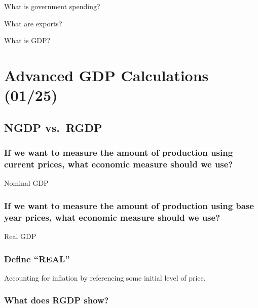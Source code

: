 \documentclass[
  letterpaper,
  DIV=11,
  numbers=noendperiod]{scrartcl}
\begin{document}
What is government spending?

What are exports?

What is GDP?

\newpage{}

\hypertarget{advanced-gdp-calculations-0125}{%
\section{Advanced GDP Calculations
(01/25)}\label{advanced-gdp-calculations-0125}}

\hypertarget{ngdp-vs.-rgdp}{%
\subsection{NGDP vs.~RGDP}\label{ngdp-vs.-rgdp}}

\hypertarget{if-we-want-to-measure-the-amount-of-production-using-current-prices-what-economic-measure-should-we-use}{%
\subsubsection{If we want to measure the amount of production using
current prices, what economic measure should we
use?}\label{if-we-want-to-measure-the-amount-of-production-using-current-prices-what-economic-measure-should-we-use}}

Nominal GDP

\hypertarget{if-we-want-to-measure-the-amount-of-production-using-base-year-prices-what-economic-measure-should-we-use}{%
\subsubsection{If we want to measure the amount of production using base
year prices, what economic measure should we
use?}\label{if-we-want-to-measure-the-amount-of-production-using-base-year-prices-what-economic-measure-should-we-use}}

Real GDP

\hypertarget{define-real}{%
\subsubsection{Define ``REAL''}\label{define-real}}

Accounting for inflation by referencing some initial level of price.

\hypertarget{what-does-rgdp-show}{%
\subsubsection{What does RGDP show?}\label{what-does-rgdp-show}}
\end{document}
